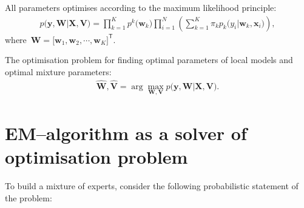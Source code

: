 \documentclass[12pt, twoside]{article}
\begin{document}
All parameters optimises according to the maximum likelihood principle:
\[
\label{eq:st:4}
\begin{aligned}
p\bigr(\mathbf{y}, \mathbf{W}|\mathbf{X}, \mathbf{V}\bigr) = \prod_{k=1}^{K}p^{k}\bigr(\mathbf{w}_k\bigr)\prod_{i=1}^{N}\left(\sum_{k=1}^{K}\pi_{k}p_{k}\bigr(y_i|\mathbf{w}_k, \mathbf{x}_i\bigr)\right),
\end{aligned}
\]
where~$\mathbf{W} = \bigr[\mathbf{w}_1, \mathbf{w}_2, \cdots, \mathbf{w}_K\bigr]^{\mathsf{T}}.$

The optimisation problem for finding optimal parameters of local models and optimal mixture parameters:
\[
\label{eq:st:5}
\begin{aligned}
\hat{\mathbf{W}}, \hat{\mathbf{V}} = \arg\max_{\mathbf{W}, \mathbf{V}} p\bigr(\mathbf{y}, \mathbf{W}|\mathbf{X}, \mathbf{V}\bigr).
\end{aligned}
\]

\section{EM--algorithm as a solver of optimisation problem }
To build a mixture of experts, consider the following probabilistic statement of the problem:
\end{document}

